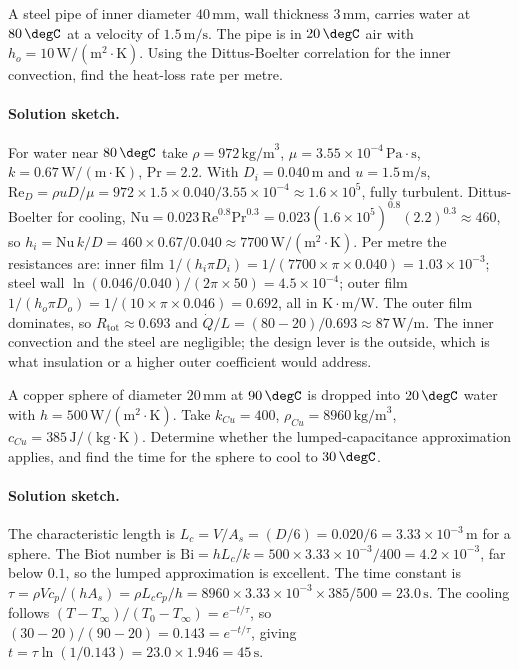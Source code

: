 \begin{exercise}
A steel pipe of inner diameter $40\,\si{\milli\meter}$, wall thickness
$3\,\si{\milli\meter}$, carries water at $80\,\degC$ at a velocity of
$1.5\,\text{m/s}$. The pipe is in $20\,\degC$ air with $h_o = 10\,
\text{W}/(\text{m}^2\cdot\si{\kelvin})$. Using the Dittus-Boelter
correlation for the inner convection, find the heat-loss rate per
metre.
\paragraph{Solution sketch.} For water near $80\,\degC$ take
$\rho = 972\,\text{kg/m}^3$, $\mu = 3.55 \times 10^{-4}\,\text{Pa}\cdot
\text{s}$, $k = 0.67\,\text{W}/(\text{m}\cdot\si{\kelvin})$,
$\text{Pr} = 2.2$. With $D_i = 0.040\,\text{m}$ and $u = 1.5\,\text{m/s}$,
$\text{Re}_D = \rho u D/\mu = 972 \times 1.5 \times 0.040/3.55\times
10^{-4} \approx 1.6 \times 10^5$, fully turbulent. Dittus-Boelter for
cooling, $\text{Nu} = 0.023\,\text{Re}^{0.8}\text{Pr}^{0.3} = 0.023
(1.6\times10^5)^{0.8}(2.2)^{0.3} \approx 460$, so $h_i = \text{Nu}\,k/D
= 460 \times 0.67/0.040 \approx 7700\,\text{W}/(\text{m}^2\cdot
\si{\kelvin})$. Per metre the resistances are: inner film $1/(h_i \pi
D_i) = 1/(7700 \times \pi \times 0.040) = 1.03 \times 10^{-3}$; steel
wall $\ln(0.046/0.040)/(2\pi \times 50) = 4.5 \times 10^{-4}$; outer
film $1/(h_o \pi D_o) = 1/(10 \times \pi \times 0.046) = 0.692$, all in
$\si{\kelvin}\cdot\text{m}/\text{W}$. The outer film dominates, so
$R_{\text{tot}} \approx 0.693$ and $\dot{Q}/L = (80 - 20)/0.693 \approx
87\,\text{W}/\text{m}$. The inner convection and the steel are
negligible; the design lever is the outside, which is what insulation
or a higher outer coefficient would address.
\end{exercise}

\begin{exercise}
A copper sphere of diameter $20\,\si{\milli\meter}$ at $90\,\degC$ is
dropped into $20\,\degC$ water with $h = 500\,\text{W}/(\text{m}^2
\cdot\si{\kelvin})$. Take $k_{Cu} = 400$, $\rho_{Cu} = 8960\,\text{kg/m}
^3$, $c_{Cu} = 385\,\text{J}/(\text{kg}\cdot\si{\kelvin})$. Determine
whether the lumped-capacitance approximation applies, and find the
time for the sphere to cool to $30\,\degC$.
\paragraph{Solution sketch.} The characteristic length is $L_c = V/A_s
= (D/6) = 0.020/6 = 3.33 \times 10^{-3}\,\text{m}$ for a sphere. The
Biot number is $\text{Bi} = h L_c/k = 500 \times 3.33\times10^{-3}/400
= 4.2 \times 10^{-3}$, far below $0.1$, so the lumped approximation is
excellent. The time constant is $\tau = \rho V c_p/(h A_s) = \rho L_c
c_p/h = 8960 \times 3.33\times10^{-3} \times 385/500 = 23.0\,\text{s}$.
The cooling follows $(T - T_\infty)/(T_0 - T_\infty) = e^{-t/\tau}$, so
$(30 - 20)/(90 - 20) = 0.143 = e^{-t/\tau}$, giving $t = \tau\ln(1/0.143)
= 23.0 \times 1.946 = 45\,\text{s}$.
\end{exercise}

